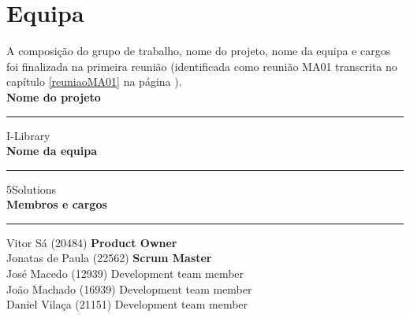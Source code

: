 \newpage

\section{Equipa}

A composição do grupo de trabalho, nome do projeto, nome da equipa e cargos foi finalizada na primeira reunião (identificada como reunião MA01 transcrita no capítulo \ref{reuniaoMA01} na página \pageref{reuniaoMA01}).\\[4mm]

\noindent \textbf{Nome do projeto}\\
\noindent \rule{\linewidth}{0.4pt}
\noindent I-Library \\

\noindent \textbf{Nome da equipa}\\
\noindent \rule{\linewidth}{0.4pt}
\noindent 5Solutions \\

\noindent \textbf{Membros e cargos}\\
\noindent \rule{\linewidth}{0.4pt}
\noindent Vitor Sá (20484) \textbf{Product Owner}\\
\noindent Jonatas de Paula  (22562) \textbf{Scrum Master}\\
\noindent José Macedo (12939) Development team member\\
\noindent João Machado (16939) Development team member\\
\noindent Daniel Vilaça (21151) Development team member\\
